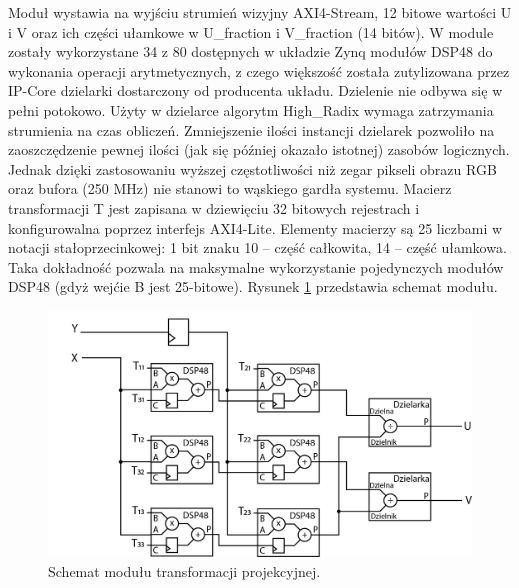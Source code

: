 Moduł wystawia na wyjściu strumień wizyjny AXI4-Stream, 12 bitowe wartości U i V oraz ich części ułamkowe w U\_fraction i V\_fraction (14 bitów). %
W module zostały wykorzystane 34 z 80 dostępnych w układzie Zynq modułów DSP48 do wykonania operacji arytmetycznych, z czego większość została zutylizowana przez IP-Core dzielarki dostarczony od producenta układu. %
Dzielenie nie odbywa się w pełni potokowo. Użyty w dzielarce algorytm High\_Radix wymaga zatrzymania strumienia na czas obliczeń. Zmniejszenie ilości instancji dzielarek pozwoliło na zaoszczędzenie pewnej ilości (jak się później okazało istotnej) zasobów logicznych.
Jednak dzięki zastosowaniu wyższej częstotliwości niż zegar pikseli obrazu RGB oraz bufora (250 MHz) nie stanowi to wąskiego gardła systemu. %
Macierz transformacji T jest zapisana w dziewięciu 32 bitowych rejestrach i konfigurowalna poprzez interfejs AXI4-Lite. 
Elementy macierzy są 25 liczbami w notacji stałoprzecinkowej: 1 bit znaku 10 – część całkowita, 14 – część ułamkowa. Taka dokładność pozwala na maksymalne wykorzystanie pojedynczych modułów DSP48 (gdyż wejćie B jest 25-bitowe). Rysunek \ref{fig:transfProjek} przedstawia schemat modułu.
\begin{figure}
\centering
\includegraphics[width=0.70\linewidth]{images/transfProjek.png}
\caption[Schemat modułu transformacji projekcyjnej.]{Schemat modułu transformacji projekcyjnej.}
\label{fig:transfProjek}
\end{figure}
